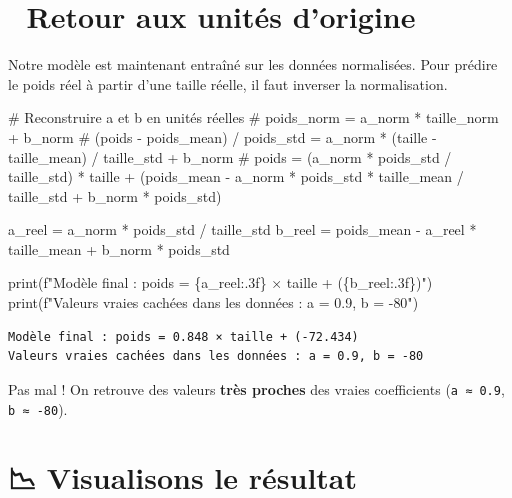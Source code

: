 \documentclass[
  french,
  11pt,
  a4paper,
]{scrbook}
\newenvironment{Shaded}{}{}
\newcommand{\BuiltInTok}[1]{\textcolor[rgb]{0.84,0.23,0.29}{#1}}
\newcommand{\CommentTok}[1]{\textcolor[rgb]{0.42,0.45,0.49}{#1}}
\newcommand{\NormalTok}[1]{\textcolor[rgb]{0.14,0.16,0.18}{#1}}
\newcommand{\OperatorTok}[1]{\textcolor[rgb]{0.14,0.16,0.18}{#1}}
\newcommand{\SpecialCharTok}[1]{\textcolor[rgb]{0.00,0.36,0.77}{#1}}
\newcommand{\SpecialStringTok}[1]{\textcolor[rgb]{0.01,0.18,0.38}{#1}}
\begin{document}
\section{🔄 Retour aux unités
d'origine}\label{retour-aux-unituxe9s-dorigine}

Notre modèle est maintenant entraîné sur les données normalisées. Pour
prédire le poids réel à partir d'une taille réelle, il faut inverser la
normalisation.

\begin{Shaded}
\begin{Highlighting}[]
\CommentTok{\# Reconstruire a et b en unités réelles}
\CommentTok{\# poids\_norm = a\_norm * taille\_norm + b\_norm}
\CommentTok{\# (poids {-} poids\_mean) / poids\_std = a\_norm * (taille {-} taille\_mean) / taille\_std + b\_norm}
\CommentTok{\# poids = (a\_norm * poids\_std / taille\_std) * taille + (poids\_mean {-} a\_norm * poids\_std * taille\_mean / taille\_std + b\_norm * poids\_std)}

\NormalTok{a\_reel }\OperatorTok{=}\NormalTok{ a\_norm }\OperatorTok{*}\NormalTok{ poids\_std }\OperatorTok{/}\NormalTok{ taille\_std}
\NormalTok{b\_reel }\OperatorTok{=}\NormalTok{ poids\_mean }\OperatorTok{{-}}\NormalTok{ a\_reel }\OperatorTok{*}\NormalTok{ taille\_mean }\OperatorTok{+}\NormalTok{ b\_norm }\OperatorTok{*}\NormalTok{ poids\_std}

\BuiltInTok{print}\NormalTok{(}\SpecialStringTok{f"Modèle final : poids = }\SpecialCharTok{\{}\NormalTok{a\_reel}\SpecialCharTok{:.3f\}}\SpecialStringTok{ × taille + (}\SpecialCharTok{\{}\NormalTok{b\_reel}\SpecialCharTok{:.3f\}}\SpecialStringTok{)"}\NormalTok{)}
\BuiltInTok{print}\NormalTok{(}\SpecialStringTok{f"Valeurs vraies cachées dans les données : a = 0.9, b = {-}80"}\NormalTok{)}
\end{Highlighting}
\end{Shaded}

\begin{verbatim}
Modèle final : poids = 0.848 × taille + (-72.434)
Valeurs vraies cachées dans les données : a = 0.9, b = -80
\end{verbatim}

Pas mal ! On retrouve des valeurs \textbf{très proches} des vraies
coefficients (\texttt{a\ ≈\ 0.9}, \texttt{b\ ≈\ -80}).

\section{📉 Visualisons le résultat}\label{visualisons-le-ruxe9sultat}
\end{document}
